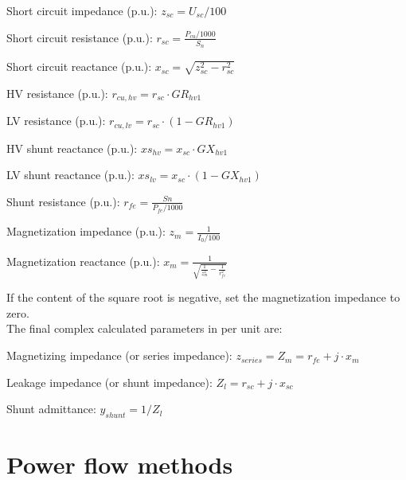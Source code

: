 \documentclass[11pt,fleqn]{book} %
\begin{document}
Short circuit impedance (p.u.): $z_{sc} = U_{sc} / 100$\newline

Short circuit resistance (p.u.): $r_{sc} = \frac{P_{cu} / 1000}{S_n}$\newline

Short circuit reactance (p.u.): $x_{sc} = \sqrt{z_{sc}^2 - r_{sc} ^2}$\newline


HV resistance (p.u.): $r_{cu,hv} = r_{sc} \cdot GR_{hv1}$\newline


LV resistance (p.u.): $r_{cu,lv} = r_{sc} \cdot (1 - GR_{hv1})$\newline


HV shunt reactance (p.u.): $xs_{hv} = x_{sc} \cdot GX_{hv1}$\newline


LV shunt reactance (p.u.): $xs_{lv} = x_{sc} \cdot (1 - GX_{hv1})$\newline

Shunt resistance (p.u.): $r_{fe} = \frac{Sn}{P_{fe} / 1000}$\newline


Magnetization impedance (p.u.): $z_m = \frac{1}{I_0 / 100}$\newline

Magnetization reactance (p.u.): $x_m = \frac{1}{\sqrt{\frac{1}{z_m^2} - \frac{1}{r_{fe}^2}}}$ \newline

If the content of the square root is negative, set the magnetization impedance to zero.\\


The final complex calculated parameters in per unit are:

Magnetizing impedance (or series impedance): $z_{series} = Z_m = r_{fe} +j \cdot x_m$

Leakage impedance (or shunt impedance): $Z_l = r_{sc} + j \cdot x_{sc}$

Shunt admittance: $y_{shunt} = 1 / Z_l$


\chapter{Power flow methods}
\end{document}

